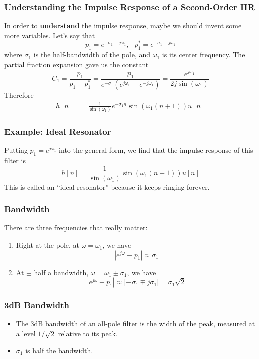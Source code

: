 \documentclass{beamer}
\begin{document}
\begin{frame}
  \frametitle{Understanding the Impulse Response of a Second-Order IIR}

  In order to {\bf understand} the impulse response, maybe we should
  invent some more variables.  Let's say that
  \[
  p_1 = e^{-\sigma_1+j\omega_1},~~~p_1^* = e^{-\sigma_1-j\omega_1}
  \]
  where $\sigma_1$ is the half-bandwidth of the pole, and $\omega_1$
  is its center frequency.  The partial fraction expansion gave us the constant
  \begin{displaymath}
    C_1 = \frac{p_1}{p_1-p_1^*}= \frac{p_1}{e^{-\sigma_1}\left(e^{j\omega_1}-e^{-j\omega_1}\right)}
    = \frac{e^{j\omega_1}}{2j\sin(\omega_1)}
  \end{displaymath}
  Therefore
  \begin{align*}
    h[n] &= \frac{1}{\sin(\omega_1)} e^{-\sigma_1n}\sin(\omega_1(n+1)) u[n]
  \end{align*}
\end{frame}

\begin{frame}
  \frametitle{Example: Ideal Resonator}

  Putting $p_1=e^{j\omega_1}$ into the general form, we find that the
  impulse response of this filter is
  \[
  h[n] = \frac{1}{\sin(\omega_1)}\sin(\omega_1 (n+1))u[n]
  \]
  This is called an ``ideal resonator'' because it keeps ringing forever.
  
\end{frame}

\begin{frame}
  \frametitle{Bandwidth}

  There are three frequencies that really matter:
  \begin{enumerate}
  \item Right at the pole, at $\omega=\omega_1$, we have
    \begin{displaymath}
      |e^{j\omega}-p_1|\approx \sigma_1
    \end{displaymath}
  \item At $\pm$ half a bandwidth, $\omega=\omega_1\pm\sigma_1$, we have
    \begin{displaymath}
      |e^{j\omega}-p_1|\approx |-\sigma_1\mp j\sigma_1| = \sigma_1\sqrt{2}
    \end{displaymath}
  \end{enumerate}
\end{frame}  

\begin{frame}
  \frametitle{3dB Bandwidth}

  \begin{itemize}
  \item The 3dB bandwidth of an all-pole filter is the width of the peak,
    measured at a level $1/\sqrt{2}$ relative to its peak.
  \item $\sigma_1$ is half the bandwidth.
  \end{itemize}
\end{frame}  
\end{document}
